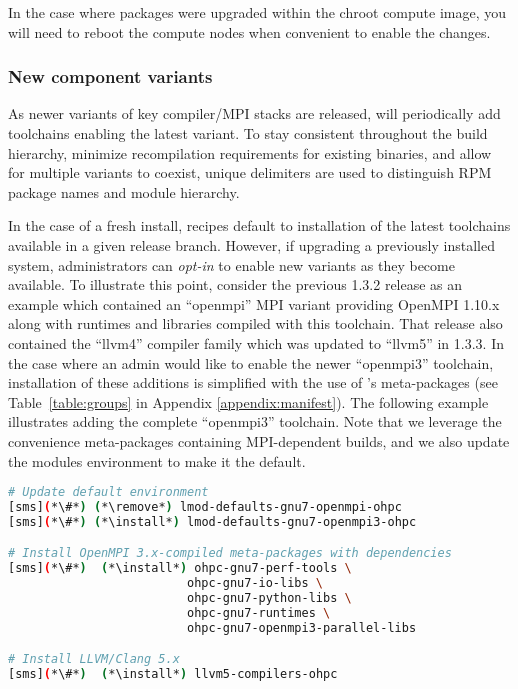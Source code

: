 \noindent In the case where packages were upgraded within the chroot compute image,
you will need to reboot the compute nodes when convenient to enable the
changes.

\subsubsection{New component variants}

As newer variants of key compiler/MPI stacks are released, \OHPC{} will
periodically add toolchains enabling the latest variant. To stay consistent
throughout the build hierarchy, minimize recompilation requirements for existing
binaries, and allow for multiple variants to coexist, unique delimiters are
used to distinguish RPM package names and module hierarchy.

In the case of a fresh install, \OHPC{} recipes default to installation of the
latest toolchains available in a given release branch. However, if upgrading a
previously installed system, administrators can {\em opt-in} to enable new
variants as they become available. To illustrate this point, consider the
previous \OHPC{} 1.3.2 release as an example which contained an {``openmpi''}
MPI variant providing OpenMPI 1.10.x along with runtimes and libraries compiled
with this toolchain. That release also contained the {``llvm4''} compiler
family which was updated to {``llvm5''} in \OHPC{} 1.3.3.  In the case
where an admin would like to enable the newer {``openmpi3''} toolchain,
installation of these additions is simplified with the use of \OHPC{}'s
meta-packages (see Table~\ref{table:groups} in Appendix
\ref{appendix:manifest}).  The following example illustrates adding the
complete ``openmpi3'' toolchain.  Note that we leverage the convenience
meta-packages containing MPI-dependent builds, and we also update the
modules environment to make it the default.

\begin{lstlisting}[language=bash,keywords={}]
# Update default environment
[sms](*\#*) (*\remove*) lmod-defaults-gnu7-openmpi-ohpc
[sms](*\#*) (*\install*) lmod-defaults-gnu7-openmpi3-ohpc

# Install OpenMPI 3.x-compiled meta-packages with dependencies
[sms](*\#*)  (*\install*) ohpc-gnu7-perf-tools \
                         ohpc-gnu7-io-libs \
                         ohpc-gnu7-python-libs \
                         ohpc-gnu7-runtimes \
                         ohpc-gnu7-openmpi3-parallel-libs

# Install LLVM/Clang 5.x
[sms](*\#*)  (*\install*) llvm5-compilers-ohpc
\end{lstlisting}

